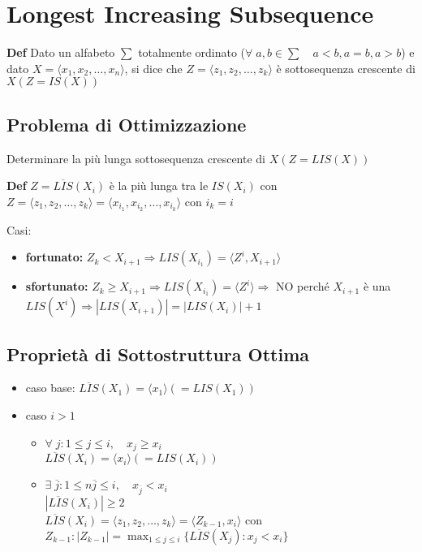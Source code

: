 \section{Longest Increasing Subsequence}
\begin{mdframed}
    \textbf{Def} \quad Dato un alfabeto $\sum$ totalmente ordinato ($\forall\; a,b \in \sum \quad a<b, a=b, a>b$) e dato $X = \langle x_1,x_2,\ldots,x_n \rangle$, si dice che $Z = \langle z_1,z_2,\ldots,z_k \rangle$ è sottosequenza crescente di $X (Z = IS(X))$
\end{mdframed}

\subsection{Problema di Ottimizzazione}
Determinare la più lunga sottosequenza crescente di $X(Z = LIS(X))$
\begin{mdframed}
    \textbf{Def} \quad $Z = \overline{LIS}(X_i)$ è la più lunga tra le $IS(X_i)$ con $Z = \langle z_1,z_2,\ldots,z_k \rangle = \langle x_{i_1},x_{i_2},\ldots,x_{i_k} \rangle$ con $i_k = i$
\end{mdframed}
Casi:
\begin{itemize}
    \item \textbf{fortunato:} $Z_k < X_{i+1} \Rightarrow LIS(X_{i_1}) = \langle Z^i, X_{i+1} \rangle$
    \item \textbf{sfortunato:} $Z_k \geq X_{i+1} \Rightarrow LIS(X_{i_1}) = \langle Z^i \rangle \Rightarrow$ NO perché $X_{i+1}$ è una $LIS(X^i) \Rightarrow |LIS(X_{i+1})| = |LIS(X_i)| + 1$
\end{itemize}

\subsection{Proprietà di Sottostruttura Ottima}
\begin{itemize}
    \item caso base: $\overline{LIS}(X_1) = \langle x_1 \rangle (= LIS(X_1))$
    \item caso $i>1$
    \begin{itemize}
        \item $\forall\; j : 1 \leq j \leq i, \quad x_j \geq x_i$ \\
              $\overline{LIS}(X_i) = \langle x_i \rangle (= LIS(X_i))$
        \item $\exists\; \overline{j} : 1 \leq n \overline{j} \leq i, \quad x_{\overline{j}} < x_i$ \\
              $|\overline{LIS}(X_i)| \geq 2$ \\
              $\overline{LIS}(X_i) = \langle z_1,z_2, \ldots, z_k \rangle = \langle Z_{k-1}, x_i \rangle$ con $Z_{k-1} : |Z_{k-1}| = \max_{1 \leq j \leq i} \{\overline{LIS}(X_j) : x_j < x_i\}$
    \end{itemize}
\end{itemize}

